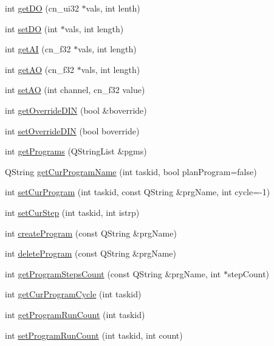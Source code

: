 \begin{DoxyCompactItemize}
\item 
int \hyperlink{classCUIApp_ade6a8c4817b025076a76d5d1c36c8f7a}{get\-D\-O} (cn\-\_\-ui32 $\ast$vals, int lenth)
\item 
int \hyperlink{classCUIApp_a994ecfe4ec23e565c0a7be4100867aa8}{set\-D\-O} (int $\ast$vals, int length)
\item 
int \hyperlink{classCUIApp_a15a6be8b534004d69462e879ca47d2cf}{get\-A\-I} (cn\-\_\-f32 $\ast$vals, int length)
\item 
int \hyperlink{classCUIApp_ab1953f84d2678e22425bdf2a77d721b7}{get\-A\-O} (cn\-\_\-f32 $\ast$vals, int length)
\item 
int \hyperlink{classCUIApp_aec709af257dd9baac1a891f3495902a3}{set\-A\-O} (int channel, cn\-\_\-f32 value)
\item 
int \hyperlink{classCUIApp_adef4e805121b59f9457b4ddf16aecbf8}{get\-Override\-D\-I\-N} (bool \&boverride)
\item 
int \hyperlink{classCUIApp_a1145d1a8d1db9391696cccecdee904d0}{set\-Override\-D\-I\-N} (bool boverride)
\item 
int \hyperlink{classCUIApp_ac5c2c5f0cebb36c358dc938a6eaaef6a}{get\-Programs} (Q\-String\-List \&pgms)
\item 
Q\-String \hyperlink{classCUIApp_a369cfe1db4b1f3d93e8f39ce9e3160e6}{get\-Cur\-Program\-Name} (int taskid, bool plan\-Program=false)
\item 
int \hyperlink{classCUIApp_a0b0973b55c62a2108e2f3a4b6e3d83f5}{set\-Cur\-Program} (int taskid, const Q\-String \&prg\-Name, int cycle=-\/1)
\item 
int \hyperlink{classCUIApp_ac137f1bd9ac1ada393c069943af1404c}{set\-Cur\-Step} (int taskid, int istrp)
\item 
int \hyperlink{classCUIApp_a15aeca2eb05975a0d22fdd92e3580f7a}{create\-Program} (const Q\-String \&prg\-Name)
\item 
int \hyperlink{classCUIApp_a12802aa0fbd6f6ec3ab9ef8a68ae3d5f}{delete\-Program} (const Q\-String \&prg\-Name)
\item 
int \hyperlink{classCUIApp_af7aa5b3cb8ec0e3053f2c594c2d53d33}{get\-Program\-Steps\-Count} (const Q\-String \&prg\-Name, int $\ast$step\-Count)
\item 
int \hyperlink{classCUIApp_acf883a14e463b52807f8eb1451db1e78}{get\-Cur\-Program\-Cycle} (int taskid)
\item 
int \hyperlink{classCUIApp_ad12e56e44ce01e82bd70616c0448598a}{get\-Program\-Run\-Count} (int taskid)
\item 
int \hyperlink{classCUIApp_ac9d5e6115e0369c90d96a58e208fe9ba}{set\-Program\-Run\-Count} (int taskid, int count)

\end{DoxyCompactItemize}
